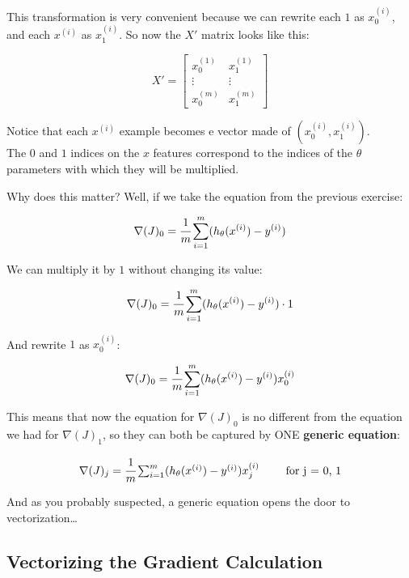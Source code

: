 \documentclass[]{article}
\begin{document}
This transformation is very convenient because we can rewrite each \(1\)
as \(x_0^{(i)}\), and each \(x^{(i)}\) as \(x_1^{(i)}\). So now the
\(X'\) matrix looks like this:

\large

\[
X' = \begin{bmatrix} x_0^{(1)} & x_1^{(1)} \\ \vdots & \vdots \\ x_0^{(m)} & x_1^{(m)}\end{bmatrix}
\] \normalsize

Notice that each \(x^{(i)}\) example becomes e vector made of
\((x^{(i)}_0, x^{(i)}_1)\).\\
The \(0\) and \(1\) indices on the \(x\) features correspond to the
indices of the \(\theta\) parameters with which they will be multiplied.

Why does this matter? Well, if we take the equation from the previous
exercise:

\large

\[
\nabla(J)_0 = \cfrac{1}{m}\sum_{i=1}^{m}(h_{\theta}(x^{(i)}) - y^{(i)})
\] \normalsize

We can multiply it by \(1\) without changing its value:

\large

\[
\nabla(J)_0 = \cfrac{1}{m}\sum_{i=1}^{m}(h_{\theta}(x^{(i)}) - y^{(i)}) \cdot 1
\] \normalsize

And rewrite \(1\) as \(x_0^{(i)}\):

\large

\[
\nabla(J)_0 = \cfrac{1}{m}\sum_{i=1}^{m}(h_{\theta}(x^{(i)}) - y^{(i)})x_{0}^{(i)}
\] \normalsize

This means that now the equation for \(\nabla(J)_0\) is no different
from the equation we had for \(\nabla(J)_1\), so they can both be
captured by ONE \textbf{generic equation}:

\large

\[
\begin{matrix}
\nabla(J)_j = \cfrac{1}{m}\sum_{i=1}^{m}(h_{\theta}(x^{(i)}) - y^{(i)})x_{j}^{(i)} & & \text{ for j = 0, 1}    
\end{matrix}
\] \normalsize

And as you probably suspected, a generic equation opens the door to
vectorization\ldots{}

\hypertarget{vectorizing-the-gradient-calculation}{%
\subsection{Vectorizing the Gradient
Calculation}\label{vectorizing-the-gradient-calculation}}
\end{document}

